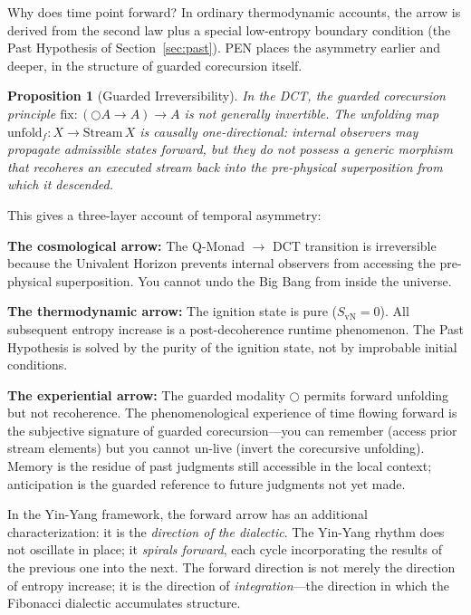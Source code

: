 \documentclass[12pt,a4paper]{article}
\newtheorem{proposition}{Proposition}[section]
\newcommand{\nextmod}{\bigcirc}
\begin{document}
Why does time point forward? In ordinary thermodynamic accounts, the arrow is derived from the second law plus a special low-entropy boundary condition (the Past Hypothesis of Section~\ref{sec:past}). PEN places the asymmetry earlier and deeper, in the structure of guarded corecursion itself.

\begin{proposition}[Guarded Irreversibility]
\label{prop:irreversibility}
In the DCT, the guarded corecursion principle $\mathrm{fix} : (\nextmod A \to A) \to A$ is not generally invertible. The unfolding map $\mathrm{unfold}_f : X \to \mathrm{Stream}\,X$ is causally one-directional: internal observers may propagate admissible states forward, but they do not possess a generic morphism that recoheres an executed stream back into the pre-physical superposition from which it descended.
\end{proposition}

This gives a three-layer account of temporal asymmetry:

\textbf{The cosmological arrow:} The Q-Monad $\to$ DCT transition is irreversible because the Univalent Horizon prevents internal observers from accessing the pre-physical superposition. You cannot undo the Big Bang from inside the universe.

\textbf{The thermodynamic arrow:} The ignition state is pure ($S_{\mathrm{vN}} = 0$). All subsequent entropy increase is a post-decoherence runtime phenomenon. The Past Hypothesis is solved by the purity of the ignition state, not by improbable initial conditions.

\textbf{The experiential arrow:} The guarded modality $\nextmod$ permits forward unfolding but not recoherence. The phenomenological experience of time flowing forward is the subjective signature of guarded corecursion---you can remember (access prior stream elements) but you cannot un-live (invert the corecursive unfolding). Memory is the residue of past judgments still accessible in the local context; anticipation is the guarded reference to future judgments not yet made.

In the Yin-Yang framework, the forward arrow has an additional characterization: it is the \emph{direction of the dialectic}. The Yin-Yang rhythm does not oscillate in place; it \emph{spirals forward}, each cycle incorporating the results of the previous one into the next. The forward direction is not merely the direction of entropy increase; it is the direction of \emph{integration}---the direction in which the Fibonacci dialectic accumulates structure.
\end{document}
